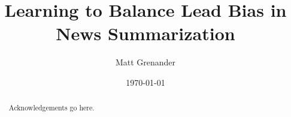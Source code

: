 \documentclass[12pt, oneside, extrafontsizes]{memoir}  %
\theoremstyle{plain}
\theoremstyle{definition}
\begin{document}

\pretitle{\begin{center}\cftchapterfont\huge}
\posttitle{\end{center}}
\preauthor{\begin{center}\huge}
\postauthor{\end{center}}
\predate{\begin{center}\large}
\postdate{\end{center}}

\title{Learning to Balance Lead Bias in News Summarization}
\author{Matt Grenander}
\date{\today}
\renewcommand\maketitlehookb{
\vfill
}
\renewcommand\maketitlehookc{
\vfill
\begin{center}
{
\large
Department of Computer Science\\
McGill University, Montreal
}
\end{center}
\vspace{10mm}
}
\renewcommand\maketitlehookd{
\vspace{10mm}
\begin{center}
A thesis submitted to McGill University in partial fulfilment of the requirements of
the degree of Master of Science. \\
\copyright 2020 Matt Grenander
\end{center}
}

\begin{titlingpage}
\maketitle
\end{titlingpage}


\clearpage
{}
\renewcommand{\abstractname}{Acknowledgements}
\begin{abstract}
Acknowledgements go here.
\end{abstract}
\end{document}
